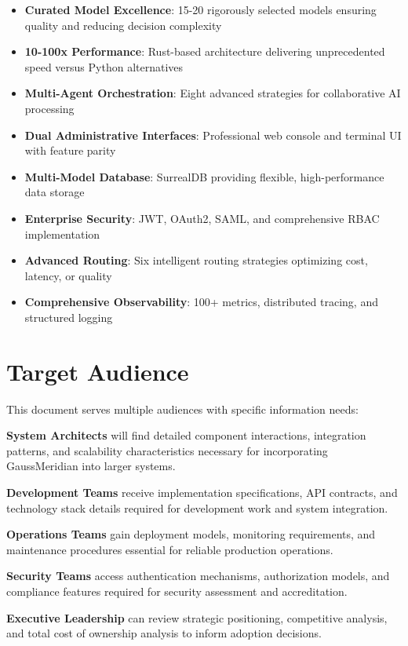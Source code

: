 \documentclass[12pt,a4paper,twoside]{report}
\begin{document}
\begin{itemize}[leftmargin=*]
    \item \textbf{Curated Model Excellence}: 15-20 rigorously selected models ensuring quality and reducing decision complexity
    \item \textbf{10-100x Performance}: Rust-based architecture delivering unprecedented speed versus Python alternatives
    \item \textbf{Multi-Agent Orchestration}: Eight advanced strategies for collaborative AI processing
    \item \textbf{Dual Administrative Interfaces}: Professional web console and terminal UI with feature parity
    \item \textbf{Multi-Model Database}: SurrealDB providing flexible, high-performance data storage
    \item \textbf{Enterprise Security}: JWT, OAuth2, SAML, and comprehensive RBAC implementation
    \item \textbf{Advanced Routing}: Six intelligent routing strategies optimizing cost, latency, or quality
    \item \textbf{Comprehensive Observability}: 100+ metrics, distributed tracing, and structured logging
\end{itemize}

\section*{Target Audience}

This document serves multiple audiences with specific information needs:

\textbf{System Architects} will find detailed component interactions, integration patterns, and scalability characteristics necessary for incorporating GaussMeridian into larger systems.

\textbf{Development Teams} receive implementation specifications, API contracts, and technology stack details required for development work and system integration.

\textbf{Operations Teams} gain deployment models, monitoring requirements, and maintenance procedures essential for reliable production operations.

\textbf{Security Teams} access authentication mechanisms, authorization models, and compliance features required for security assessment and accreditation.

\textbf{Executive Leadership} can review strategic positioning, competitive analysis, and total cost of ownership analysis to inform adoption decisions.
\end{document}
